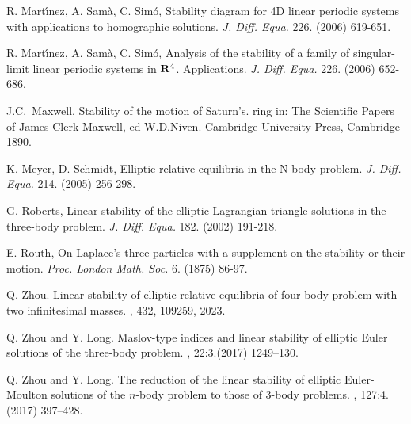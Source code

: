\documentclass[11pt]{article}
\def\R{{\bf R}}
\begin{document}
\begin{thebibliography}{}
 R. Mart\'{\i}nez, A. Sam\`{a}, C. Sim\'{o},
Stability diagram for 4D linear periodic systems with applications
to homographic solutions. {\it J. Diff. Equa.} 226. (2006) 619-651.

 R. Mart\'{\i}nez, A. Sam\`{a}, C. Sim\'{o}, Analysis of
the stability of a family of singular-limit linear periodic systems in
$\R^4$. Applications. {\it J. Diff. Equa.} 226. (2006) 652-686.

 J.C.~Maxwell,
Stability of the motion of Saturn's. ring in:
The Scientific Papers of James Clerk
Maxwell, ed W.D.Niven.
Cambridge University Press, Cambridge 1890.


 K. Meyer, D. Schmidt, Elliptic relative equilibria in
the N-body problem. {\it J. Diff. Equa.} 214. (2005) 256-298.


 G. Roberts, Linear stability of the elliptic Lagrangian
triangle solutions in the three-body problem. {\it J. Diff. Equa.}
182. (2002) 191-218.

 E. Routh, On Laplace's three particles with
a supplement on the stability or their motion. {\it Proc. London Math.
Soc.} 6. (1875) 86-97.


Q. Zhou.
\newblock Linear stability of elliptic relative equilibria of four-body problem
with two infinitesimal masses.
, 432, 109259, 2023.

Q. Zhou and Y. Long.
\newblock Maslov-type indices and linear stability of elliptic {E}uler solutions
of the three-body problem.
, 22:3.(2017) 1249--130.

Q. Zhou and Y. Long.
\newblock The reduction of the linear stability of elliptic {E}uler-{M}oulton
solutions of the {$n$}-body problem to those of 3-body problems.
, 127:4.(2017) 397--428.
\end{thebibliography}
\end{document}
